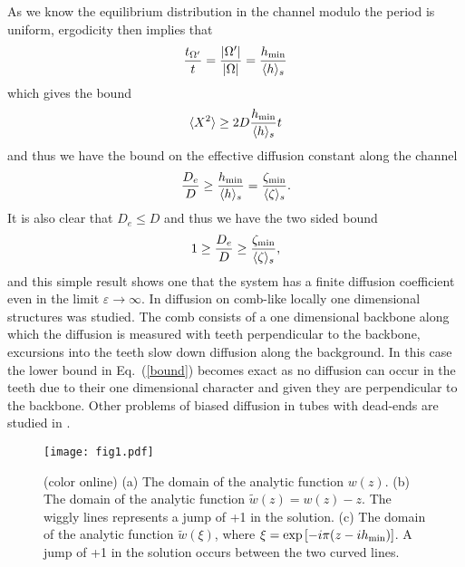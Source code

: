 \documentclass[pre,showpacs,preprintnumbers,amsmath,amssymb,superscriptaddress]{revtex4-1}
\begin{document}
{{As we know the equilibrium distribution in the channel modulo the period is uniform, ergodicity then implies that
\begin{equation}
\frac{t_{\Omega'}}{t}=\frac{|\Omega'|}{|\Omega|} = \frac{h_{\rm min}}{\langle h\rangle_s}
\end{equation}
which gives the bound
\begin{equation}
\langle X^2 \rangle \geq 2D\frac{h_{\rm min}}{\langle h\rangle_s}t
\end{equation}
and thus we have the bound on the effective diffusion constant along the channel 
\begin{equation}
\frac{D_e}{D} \geq \frac{h_{\rm min}}{\langle h\rangle_s} = \frac{\zeta_{\rm min}}{\langle \zeta\rangle_s}.\label{in1}
\end{equation}
It is also clear that $D_e \le D$ and thus we have the two sided bound
\begin{equation}
1\geq \frac{D_e}{D} \geq \frac{\zeta_{\rm min}}{\langle \zeta\rangle_s},\label{bound}
\end{equation}
and this simple result shows one that the system has a finite diffusion coefficient even in the limit $\varepsilon\to \infty$. 
In \cite{dea1993} diffusion on comb-like locally one dimensional structures was studied. The comb consists of a one dimensional backbone along which the diffusion is measured with teeth perpendicular to the backbone, excursions into the teeth slow down diffusion along the background. In this case the lower bound in Eq.~(\ref{bound}) becomes exact as no diffusion can occur in the teeth due to their one dimensional character and given they are perpendicular to the backbone. Other problems of biased diffusion in tubes with dead-ends are studied in \cite{goo1960,dag2007,ber2011b}.

\begin{figure}
\begin{center}
  \texttt{[image: fig1.pdf]}
  \caption{\label{conform}(color online) (a) The domain of the analytic function $w(z)$. (b) The domain of the analytic function $\tilde w(z) = w(z)-z$. The wiggly lines represents a jump of +1 in the solution. (c) The domain of the analytic function $\tilde w(\xi)$, where $\xi=\exp \left[-i\pi (z-ih_{\rm min})\right]$. A jump of +1 in the solution occurs between the two curved lines.}
\end{center}
\end{figure}
 
}}
\end{document}
